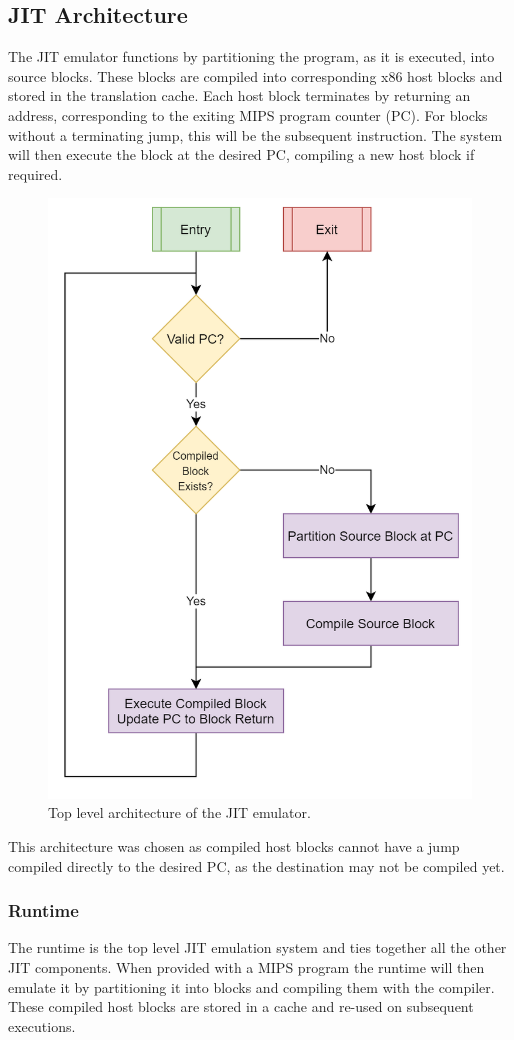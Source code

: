 \subsection{JIT Architecture}
\label{section:jit-arch}

The JIT emulator functions by partitioning the program, as it is executed, into source blocks. These blocks are compiled into corresponding x86 host blocks and stored in the translation cache. Each host block terminates by returning an address, corresponding to the exiting MIPS program counter (PC). For blocks without a terminating jump, this will be the subsequent instruction. The system will then execute the block at the desired PC, compiling a new host block if required.

\begin{figure}[h]
    \centering
    \includegraphics[width=0.5\linewidth]{diagrams/jit.png}
    \caption{Top level architecture of the JIT emulator.}
    \label{figure:jit-arch}
\end{figure}

This architecture was chosen as compiled host blocks cannot have a jump compiled directly to the desired PC, as the destination may not be compiled yet.

\subsubsection{Runtime}

The runtime is the top level JIT emulation system and ties together all the other JIT components. When provided with a MIPS program the runtime will then emulate it by partitioning it into blocks and compiling them with the compiler. These compiled host blocks are stored in a cache and re-used on subsequent executions.

